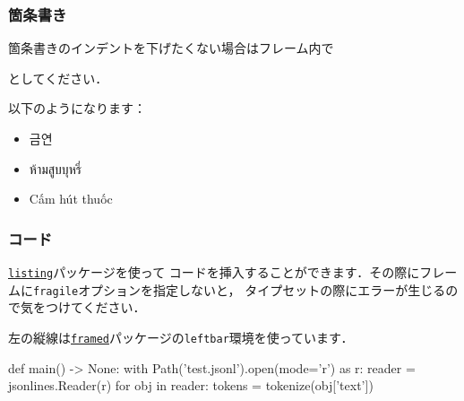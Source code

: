 \documentclass[%
  hyperref={%
    colorlinks,
    linkcolor=sDarkBlue,
    urlcolor=sDarkBlue,
    citecolor=sDarkBlue
  },
  aspectratio=169
]{beamer}
\begin{document}
    \begin{frame}[fragile]
        \frametitle{箇条書き}
        \addtolength{\leftmargini}{\labelsep}
        箇条書きのインデントを下げたくない場合はフレーム内で
        \begin{leftbar}
\begin{LaTeXCode}
\addtolength{\leftmargini}{\labelsep}
\end{LaTeXCode}
        \end{leftbar}
        としてください．

        \bigskip

        以下のようになります：

        \smallskip

        \begin{itemize}
            \item \begin{korean}금연\end{korean}
            \item \begin{thai}
ห้ามสูบบุหรี่
            \end{thai}
            \item \begin{vietnamese}
Cấm hút thuốc
            \end{vietnamese}
        \end{itemize}

    \end{frame}


    \begin{frame}[fragile]
        \frametitle{コード}
        \href{https://ctan.org/pkg/listings?lang=en}{\texttt{listing}}パッケージを使って
        コードを挿入することができます．その際にフレームに\texttt{fragile}オプションを指定しないと，
        タイプセットの際にエラーが生じるので気をつけてください．

        \bigskip

        左の縦線は\href{https://ctan.org/pkg/framed}{\texttt{framed}}パッケージの\texttt{leftbar}環境を使っています．

        \smallskip

    \begin{leftbar}
\begin{PythonCode}
def main() -> None:
    with Path('test.jsonl').open(mode='r') as r:
        reader = jsonlines.Reader(r)
        for obj in reader:
            tokens = tokenize(obj['text'])
\end{PythonCode}
    \end{leftbar}

    \end{frame}
\end{document}
